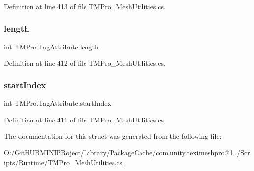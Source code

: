 Definition at line 413 of file T\+M\+Pro\+\_\+\+Mesh\+Utilities.\+cs.

\mbox{\label{struct_t_m_pro_1_1_tag_attribute_a6820685a6bbbae1fef75a97e73a46886}} 
\subsubsection{\texorpdfstring{length}{length}}
{\footnotesize\ttfamily int T\+M\+Pro.\+Tag\+Attribute.\+length}



Definition at line 412 of file T\+M\+Pro\+\_\+\+Mesh\+Utilities.\+cs.

\mbox{\label{struct_t_m_pro_1_1_tag_attribute_a4a3aad3a5e591a027eec78d4298d41d3}} 
\subsubsection{\texorpdfstring{startIndex}{startIndex}}
{\footnotesize\ttfamily int T\+M\+Pro.\+Tag\+Attribute.\+start\+Index}



Definition at line 411 of file T\+M\+Pro\+\_\+\+Mesh\+Utilities.\+cs.



The documentation for this struct was generated from the following file\+:\begin{DoxyCompactItemize}
\item 
O\+:/\+Git\+H\+U\+B\+M\+I\+N\+I\+P\+Roject/\+Library/\+Package\+Cache/com.\+unity.\+textmeshpro@1../\+Scripts/\+Runtime/\mbox{\hyperlink{_t_m_pro___mesh_utilities_8cs}{T\+M\+Pro\+\_\+\+Mesh\+Utilities.\+cs}}\end{DoxyCompactItemize}
